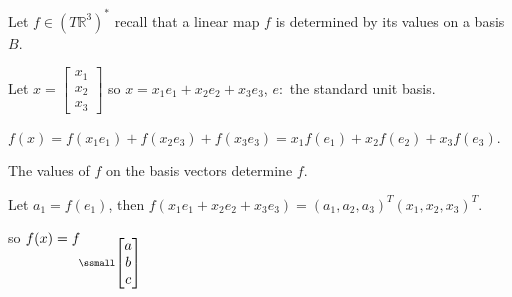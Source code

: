 \documentclass[12pt]{article}
\theoremstyle{plain}
\newcommand{\mR}{{\mathbb{R}}}
\begin{document}
		Let $f \in (T\mR^3)^*$ recall that a linear map $f$ is determined by 
		its values on a basis $B$. 

		Let $x = \begin{bmatrix}
			x_1\\
			x_2\\
			x_3
		\end{bmatrix}$ so $x = x_1e_1+x_2e_2+x_3e_3$, $e:$ the standard unit basis.
		
		$f(x) = f(x_1e_1)+f(x_2e_3)+f(x_3e_3) = x_1f(e_1)+x_2f(e_2)+x_3f(e_3)$.

		The values of $f$ on the basis vectors determine $f$.

		Let $a_1 = f(e_1)$, then $f(x_1e_1 + x_2e_2 + x_3e_3) = 
		(a_1,a_2,a_3)^T(x_1,x_2,x_3)^T$.

		so $f(x) = f_{\ssmall\begin{bmatrix}
				a\\
				b\\
				c
			\end{bmatrix}}$





	\newpage
\end{document}
